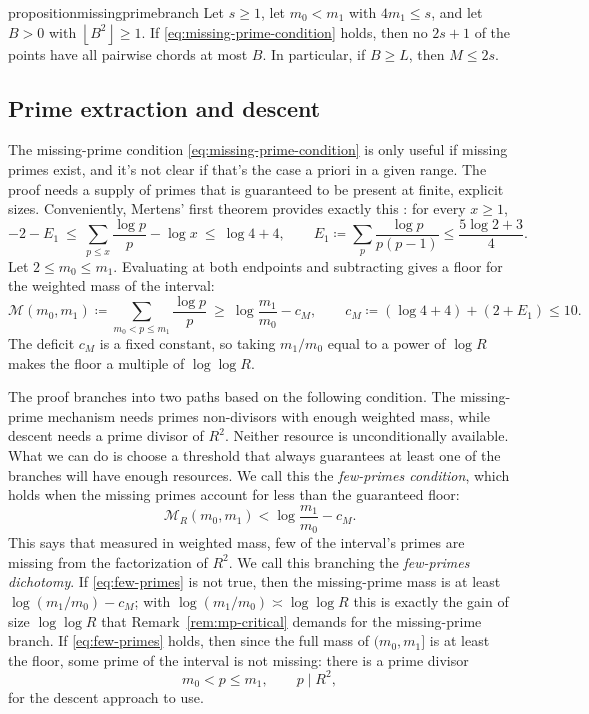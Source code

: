 \documentclass[11pt]{article}
\newcommand{\floor}[1]{\left\lfloor #1 \right\rfloor}
\newcommand{\M}{\mathcal M}
\begin{document}
\begin{restatable}{proposition}{missingprimebranch}\label{prop:missing}
Let \(s\ge1\), let \(m_0<m_1\) with \(4m_1\le s\), and let \(B>0\) with \(\floor{B^2}\ge1\).
If \eqref{eq:missing-prime-condition} holds, then no \(2s+1\) of the points have all pairwise chords at most \(B\).
In particular, if \(B\ge L\), then \(M\le 2s\).
\end{restatable}

\subsection{Prime extraction and descent}
\label{subsec:descent}

The missing-prime condition \eqref{eq:missing-prime-condition} is only useful if missing primes exist, and it's not clear if that's the case a priori in a given range.
The proof needs a supply of primes that is guaranteed to be present at finite, explicit sizes.
Conveniently, Mertens' first theorem provides exactly this \cite{Mertens1874}: for every \(x\ge1\),
\[
  -2-E_1\ \le\ \sum_{p\le x}\frac{\log p}{p}-\log x\ \le\ \log 4+4,
  \qquad
  E_1\coloneq\sum_{p}\frac{\log p}{p(p-1)}\le\frac{5\log2+3}{4}.
\]
Let \(2\le m_0\le m_1\).
Evaluating at both endpoints and subtracting gives a floor for the weighted mass of the interval:
\[
  \M(m_0,m_1)\coloneq\sum_{m_0<p\le m_1}\frac{\log p}{p}
  \ \ge\ \log\frac{m_1}{m_0}-c_M,
  \qquad
  c_M\coloneq(\log4+4)+(2+E_1)\le 10 .
\]
The deficit \(c_M\) is a fixed constant, so taking \(m_1/m_0\) equal to a power of \(\log R\) makes the floor a multiple of \(\log\log R\).

The proof branches into two paths based on the following condition.
The missing-prime mechanism needs primes non-divisors with enough weighted mass, while descent needs a prime divisor of \(R^2\).
Neither resource is unconditionally available.
What we can do is choose a threshold that always guarantees at least one of the branches will have enough resources.
We call this the \emph{few-primes condition}, which holds when the missing primes account for less than the guaranteed floor:
\[
  \M_R(m_0,m_1)<\log\frac{m_1}{m_0}-c_M.
  \tag{FP}\label{eq:few-primes}
\]
This says that measured in weighted mass, few of the interval's primes are missing from the factorization of \(R^2\).
We call this branching the \emph{few-primes dichotomy}.
If \eqref{eq:few-primes} is not true, then the missing-prime mass is at least \(\log(m_1/m_0)-c_M\); with \(\log(m_1/m_0)\asymp\log\log R\) this is exactly the gain of size \(\log\log R\) that Remark~\ref{rem:mp-critical} demands for the missing-prime branch.
If \eqref{eq:few-primes} holds, then since the full mass of \((m_0,m_1]\) is at least the floor, some prime of the interval is not missing: there is a prime divisor
\[
  m_0<p\le m_1,\qquad p\mid R^2,
\]
for the descent approach to use.
\end{document}
